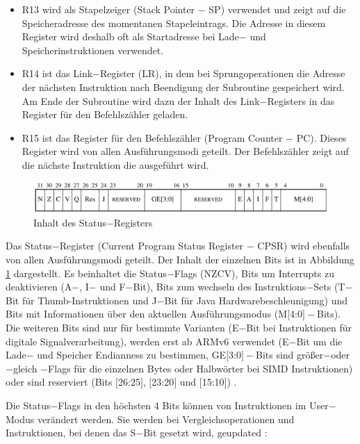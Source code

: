 \documentclass[a4paper, 11pt, onecolumn]{article}
\begin{document}
\begin{itemize}
\item R13 wird als Stapelzeiger (Stack Pointer $-$ SP) verwendet und zeigt auf die Speicheradresse des momentanen Stapeleintrags. Die Adresse in diesem Register wird deshalb oft als Startadresse bei Lade$-$ und Speicherinstruktionen verwendet.
\item R14 ist das Link$-$Register (LR), in dem bei Sprungoperationen die Adresse der nächsten Instruktion nach Beendigung der Subroutine gespeichert wird. Am Ende der Subroutine wird dazu der Inhalt des Link$-$Registers in das Register für den Befehlszähler geladen.
\item R15 ist das Register für den Befehlszähler (Program Counter $-$ PC). Dieses Register wird von allen Ausführungsmodi geteilt. Der Befehlszähler zeigt auf die nächste Instruktion die ausgeführt wird.
\end{itemize}

\begin{figure}[!htb]
\centering
\includegraphics[width=1\textwidth]{data/statusregister}
\caption{Inhalt des Status$-$Registers \cite{arm:2005}}
\label{fig:statusregister}
\end{figure}

Das Status$-$Register (Current Program Status Register $-$ CPSR) wird ebenfalls von allen Ausführungsmodi geteilt. Der Inhalt der einzelnen Bits ist in Abbildung \ref{fig:statusregister} dargestellt. Es beinhaltet die Status$-$Flags (NZCV), Bits um Interrupts zu deaktivieren (A$-$, I$-$ und F$-$Bit), Bits zum wechseln des Instruktions$-$Sets (T$-$Bit für Thumb-Instruktionen und J$-$Bit für Java Hardwarebeschleunigung) und Bits mit Informationen über den aktuellen Ausführungsmodus (M$[$4:0$]-$Bits). Die weiteren Bits sind nur für bestimmte Varianten (E$-$Bit bei Instruktionen für digitale Signalverarbeitung), werden erst ab ARMv6 verwendet (E$-$Bit um die Lade$-$ und Speicher Endianness zu bestimmen, GE$[$3:0$]-$Bits sind größer$-$oder$-$gleich
$-$Flags für die einzelnen Bytes oder Halbwörter bei SIMD Instruktionen) oder sind reserviert (Bits $[$26:25$]$, $[$23:20$]$ und $[$15:10$]$) \cite{arm:2005}.

Die Status$-$Flags in den höchsten 4 Bits können von Instruktionen im User$-$Modus verändert werden. Sie werden bei Vergleichsoperationen und Instruktionen, bei denen das S$-$Bit gesetzt wird, geupdated \cite{arm:2005}:
\end{document}
